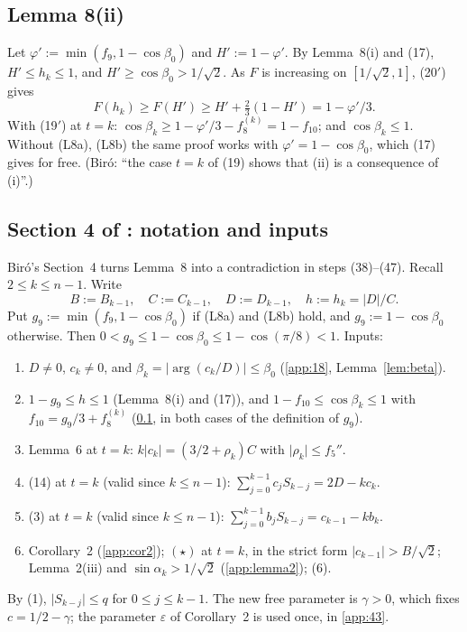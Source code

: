 \documentclass[11pt]{amsart}
\theoremstyle{remark}
\theoremstyle{plain}
\newcommand{\abs}[1]{\lvert #1\rvert}
\newcommand{\eps}{\varepsilon}
\begin{document}
\subsection{Lemma 8(ii)}\label{app:8ii}
Let $\varphi':=\min(f_9,1-\cos\beta_0)$ and $H':=1-\varphi'$. By Lemma~8(i) and (17), $H'\le h_k\le1$, and $H'\ge\cos\beta_0>1/\sqrt2$. As $F$ is increasing on $[1/\sqrt2,1]$, (20$'$) gives
\[
F(h_k)\ge F(H')\ge H'+\tfrac23(1-H')=1-\varphi'/3 .
\]
With (19$'$) at $t=k$: $\cos\beta_k\ge1-\varphi'/3-f_8^{(k)}=1-f_{10}$; and $\cos\beta_k\le1$. Without (L8a), (L8b) the same proof works with $\varphi'=1-\cos\beta_0$, which (17) gives for free. (Bir\'o: ``the case $t=k$ of (19) shows that (ii) is a consequence of (i)''.)

\subsection{Section 4 of \texorpdfstring{\cite{Bir00b}}{[Bir00b]}: notation and inputs}\label{app:sec4}
Bir\'o's Section~4 turns Lemma~8 into a contradiction in steps (38)--(47). Recall $2\le k\le n-1$. Write
\[
B:=B_{k-1},\quad C:=C_{k-1},\quad D:=D_{k-1},\quad h:=h_k=\abs D/C .
\]
Put $g_9:=\min(f_9,1-\cos\beta_0)$ if (L8a) and (L8b) hold, and $g_9:=1-\cos\beta_0$ otherwise. Then $0<g_9\le1-\cos\beta_0\le1-\cos(\pi/8)<1$. Inputs:
\begin{enumerate}[label=(I\arabic*),leftmargin=*]
\item $D\ne0$, $c_k\ne0$, and $\beta_k=\abs{\arg(c_k/D)}\le\beta_0$ (\ref{app:18}, Lemma~\ref{lem:beta}).
\item $1-g_9\le h\le1$ (Lemma~8(i) and (17)), and $1-f_{10}\le\cos\beta_k\le1$ with $f_{10}=g_9/3+f_8^{(k)}$ (\ref{app:8ii}, in both cases of the definition of $g_9$).
\item Lemma~6 at $t=k$: $k\abs{c_k}=(3/2+\rho_k)C$ with $\abs{\rho_k}\le f_5''$.
\item (14) at $t=k$ (valid since $k\le n-1$): $\sum_{j=0}^{k-1}c_jS_{k-j}=2D-kc_k$.
\item (3) at $t=k$ (valid since $k\le n-1$): $\sum_{j=0}^{k-1}b_jS_{k-j}=c_{k-1}-kb_k$.
\item Corollary~2 (\ref{app:cor2}); $(\star)$ at $t=k$, in the strict form $\abs{c_{k-1}}>B/\sqrt2$; Lemma~2(iii) and $\sin\alpha_k>1/\sqrt2$ (\ref{app:lemma2}); (6).
\end{enumerate}
By (1), $\abs{S_{k-j}}\le q$ for $0\le j\le k-1$. The new free parameter is $\gamma>0$, which fixes $c=1/2-\gamma$; the parameter $\eps$ of Corollary~2 is used once, in \ref{app:43}.
\end{document}
